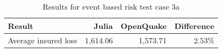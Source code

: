 \begin{table}[htbp]

\centering
\begin{tabular}{ l r r r }

\hline
\rowcolor{anti-flashwhite}
\bf{Result} & \bf{Julia} & \bf{OpenQuake} & \bf{Difference}\\
\hline
Average insured loss & 1,614.06 & 1,573.71 & 2.53\% \\
\hline
\end{tabular}

\caption{Results for event based risk test case 3a}
\label{tab:result-ebr-3a}
\end{table}